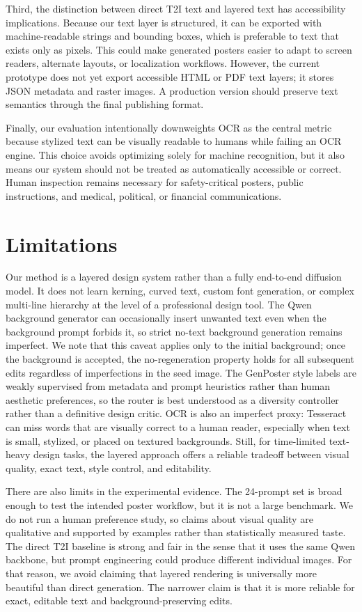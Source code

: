 \documentclass[10pt,twocolumn,letterpaper]{article}
\begin{document}
Third, the distinction between direct T2I text and layered text has accessibility implications. Because our text layer is structured, it can be exported with machine-readable strings and bounding boxes, which is preferable to text that exists only as pixels. This could make generated posters easier to adapt to screen readers, alternate layouts, or localization workflows. However, the current prototype does not yet export accessible HTML or PDF text layers; it stores JSON metadata and raster images. A production version should preserve text semantics through the final publishing format.

Finally, our evaluation intentionally downweights OCR as the central metric because stylized text can be visually readable to humans while failing an OCR engine. This choice avoids optimizing solely for machine recognition, but it also means our system should not be treated as automatically accessible or correct. Human inspection remains necessary for safety-critical posters, public instructions, and medical, political, or financial communications.

\section{Limitations}

Our method is a layered design system rather than a fully end-to-end diffusion model. It does not learn kerning, curved text, custom font generation, or complex multi-line hierarchy at the level of a professional design tool. The Qwen background generator can occasionally insert unwanted text even when the background prompt forbids it, so strict no-text background generation remains imperfect. We note that this caveat applies only to the initial background; once the background is accepted, the no-regeneration property holds for all subsequent edits regardless of imperfections in the seed image. The GenPoster style labels are weakly supervised from metadata and prompt heuristics rather than human aesthetic preferences, so the router is best understood as a diversity controller rather than a definitive design critic. OCR is also an imperfect proxy: Tesseract can miss words that are visually correct to a human reader, especially when text is small, stylized, or placed on textured backgrounds. Still, for time-limited text-heavy design tasks, the layered approach offers a reliable tradeoff between visual quality, exact text, style control, and editability.

There are also limits in the experimental evidence. The 24-prompt set is broad enough to test the intended poster workflow, but it is not a large benchmark. We do not run a human preference study, so claims about visual quality are qualitative and supported by examples rather than statistically measured taste. The direct T2I baseline is strong and fair in the sense that it uses the same Qwen backbone, but prompt engineering could produce different individual images. For that reason, we avoid claiming that layered rendering is universally more beautiful than direct generation. The narrower claim is that it is more reliable for exact, editable text and background-preserving edits.
\end{document}
